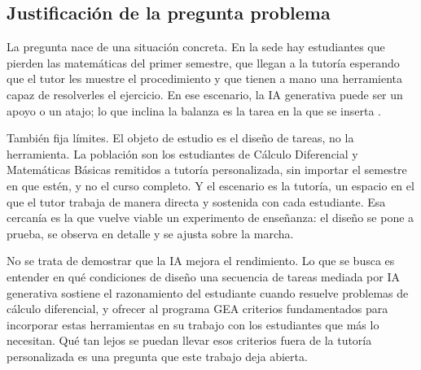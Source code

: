 \subsection*{Justificación de la pregunta problema}

La pregunta nace de una situación concreta. En la sede hay estudiantes que pierden las matemáticas del primer semestre, que llegan a la tutoría esperando que el tutor les muestre el procedimiento y que tienen a mano una herramienta capaz de resolverles el ejercicio. En ese escenario, la IA generativa puede ser un apoyo o un atajo; lo que inclina la balanza es la tarea en la que se inserta \parencite{bastani2025guardrails,unesco2023guia}.

También fija límites. El objeto de estudio es el diseño de tareas, no la herramienta. La población son los estudiantes de Cálculo Diferencial y Matemáticas Básicas remitidos a tutoría personalizada, sin importar el semestre en que estén, y no el curso completo. Y el escenario es la tutoría, un espacio en el que el tutor trabaja de manera directa y sostenida con cada estudiante. Esa cercanía es la que vuelve viable un experimento de enseñanza: el diseño se pone a prueba, se observa en detalle y se ajusta sobre la marcha.

No se trata de demostrar que la IA mejora el rendimiento. Lo que se busca es entender en qué condiciones de diseño una secuencia de tareas mediada por IA generativa sostiene el razonamiento del estudiante cuando resuelve problemas de cálculo diferencial, y ofrecer al programa GEA criterios fundamentados para incorporar estas herramientas en su trabajo con los estudiantes que más lo necesitan. Qué tan lejos se puedan llevar esos criterios fuera de la tutoría personalizada es una pregunta que este trabajo deja abierta.
